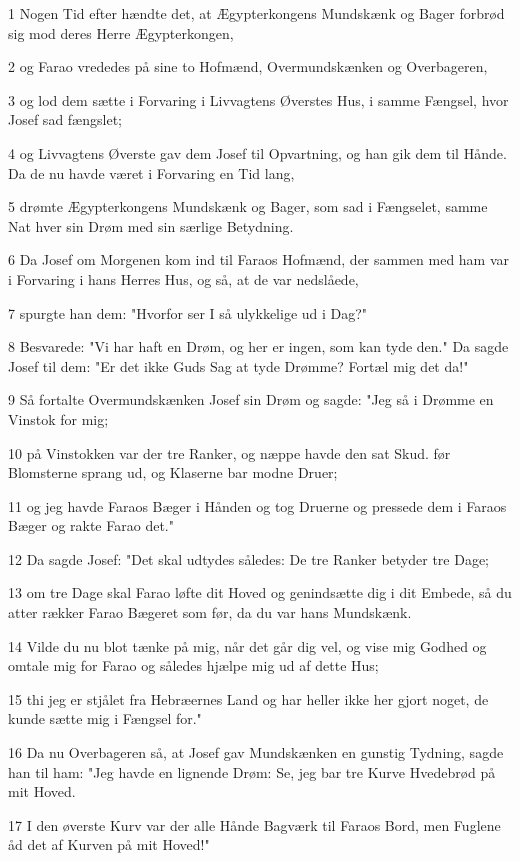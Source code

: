 \par 1 Nogen Tid efter hændte det, at Ægypterkongens Mundskænk og Bager forbrød sig mod deres Herre Ægypterkongen,
\par 2 og Farao vrededes på sine to Hofmænd, Overmundskænken og Overbageren,
\par 3 og lod dem sætte i Forvaring i Livvagtens Øverstes Hus, i samme Fængsel, hvor Josef sad fængslet;
\par 4 og Livvagtens Øverste gav dem Josef til Opvartning, og han gik dem til Hånde. Da de nu havde været i Forvaring en Tid lang,
\par 5 drømte Ægypterkongens Mundskænk og Bager, som sad i Fængselet, samme Nat hver sin Drøm med sin særlige Betydning.
\par 6 Da Josef om Morgenen kom ind til Faraos Hofmænd, der sammen med ham var i Forvaring i hans Herres Hus, og så, at de var nedslåede,
\par 7 spurgte han dem: "Hvorfor ser I så ulykkelige ud i Dag?"
\par 8 Besvarede: "Vi har haft en Drøm, og her er ingen, som kan tyde den." Da sagde Josef til dem: "Er det ikke Guds Sag at tyde Drømme? Fortæl mig det da!"
\par 9 Så fortalte Overmundskænken Josef sin Drøm og sagde: "Jeg så i Drømme en Vinstok for mig;
\par 10 på Vinstokken var der tre Ranker, og næppe havde den sat Skud. før Blomsterne sprang ud, og Klaserne bar modne Druer;
\par 11 og jeg havde Faraos Bæger i Hånden og tog Druerne og pressede dem i Faraos Bæger og rakte Farao det."
\par 12 Da sagde Josef: "Det skal udtydes således: De tre Ranker betyder tre Dage;
\par 13 om tre Dage skal Farao løfte dit Hoved og genindsætte dig i dit Embede, så du atter rækker Farao Bægeret som før, da du var hans Mundskænk.
\par 14 Vilde du nu blot tænke på mig, når det går dig vel, og vise mig Godhed og omtale mig for Farao og således hjælpe mig ud af dette Hus;
\par 15 thi jeg er stjålet fra Hebræernes Land og har heller ikke her gjort noget, de kunde sætte mig i Fængsel for."
\par 16 Da nu Overbageren så, at Josef gav Mundskænken en gunstig Tydning, sagde han til ham: "Jeg havde en lignende Drøm: Se, jeg bar tre Kurve Hvedebrød på mit Hoved.
\par 17 I den øverste Kurv var der alle Hånde Bagværk til Faraos Bord, men Fuglene åd det af Kurven på mit Hoved!"
